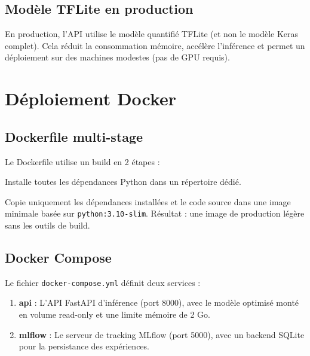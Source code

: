 \documentclass[11pt,a4paper]{article}
\begin{document}
\subsection{Modèle TFLite en production}

En production, l'API utilise le modèle quantifié TFLite (et non le modèle Keras complet). Cela réduit la consommation mémoire, accélère l'inférence et permet un déploiement sur des machines modestes (pas de GPU requis).

\section{Déploiement Docker}

\subsection{Dockerfile multi-stage}

Le Dockerfile utilise un build en 2 étapes :

\begin{description}[leftmargin=2em]
  \item[Stage 1 --- Builder] Installe toutes les dépendances Python dans un répertoire dédié.
  \item[Stage 2 --- Production] Copie uniquement les dépendances installées et le code source dans une image minimale basée sur \texttt{python:3.10-slim}. Résultat : une image de production légère sans les outils de build.
\end{description}

\subsection{Docker Compose}

Le fichier \texttt{docker-compose.yml} définit deux services :

\begin{enumerate}[leftmargin=2em]
  \item \textbf{api} : L'API FastAPI d'inférence (port 8000), avec le modèle optimisé monté en volume read-only et une limite mémoire de 2 Go.
  \item \textbf{mlflow} : Le serveur de tracking MLflow (port 5000), avec un backend SQLite pour la persistance des expériences.
\end{enumerate}
\end{document}
